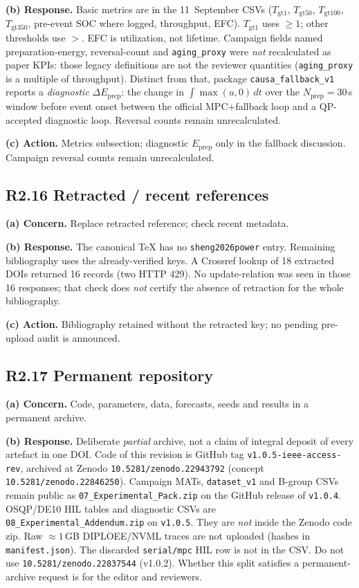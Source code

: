 \documentclass[11pt]{article}
\begin{document}
\textbf{(b) Response.} Basic metrics are in the 11~September CSVs ($T_{\mathrm{gt1}}$, $T_{\mathrm{gt50}}$, $T_{\mathrm{gt100}}$, $T_{\mathrm{gt350}}$, pre-event SOC where logged, throughput, EFC). $T_{\mathrm{gt1}}$ uses $\ge 1$; other thresholds use $>$. EFC is utilization, not lifetime. Campaign fields named preparation-energy, reversal-count and \texttt{aging\_proxy} were \emph{not} recalculated as paper KPIs: those legacy definitions are not the reviewer quantities (\texttt{aging\_proxy} is a multiple of throughput). Distinct from that, package \texttt{causa\_fallback\_v1} reports a \emph{diagnostic} $\Delta E_{\mathrm{prep}}$: the change in $\int\max(u,0)\,dt$ over the $N_{\mathrm{prep}}=30$\,s window before event onset between the official MPC+fallback loop and a QP-accepted diagnostic loop. Reversal counts remain unrecalculated.

\textbf{(c) Action.} Metrics subsection; diagnostic $E_{\mathrm{prep}}$ only in the fallback discussion. Campaign reversal counts remain unrecalculated.

\subsection*{R2.16 Retracted / recent references}
\textbf{(a) Concern.} Replace retracted reference; check recent metadata.

\textbf{(b) Response.} The canonical TeX has no \texttt{sheng2026power} entry. Remaining bibliography uses the already-verified keys. A Crossref lookup of 18 extracted DOIs returned 16 records (two HTTP 429). No update-relation was seen in those 16 responses; that check does \emph{not} certify the absence of retraction for the whole bibliography.

\textbf{(c) Action.} Bibliography retained without the retracted key; no pending pre-upload audit is announced.

\subsection*{R2.17 Permanent repository}
\textbf{(a) Concern.} Code, parameters, data, forecasts, seeds and results in a permanent archive.

\textbf{(b) Response.} Deliberate \emph{partial} archive, not a claim of integral deposit of every artefact in one DOI. Code of this revision is GitHub tag \texttt{v1.0.5-ieee-access-rev}, archived at Zenodo \texttt{10.5281/zenodo.22943792} (concept \texttt{10.5281/zenodo.22846250}). Campaign MATs, \texttt{dataset\_v1} and B-group CSVs remain public as \texttt{07\_Experimental\_Pack.zip} on the GitHub release of \texttt{v1.0.4}. OSQP/DE10 HIL tables and diagnostic CSVs are \texttt{08\_Experimental\_Addendum.zip} on \texttt{v1.0.5}. They are \emph{not} inside the Zenodo code zip. Raw $\approx 1$\,GB DIPLOEE/NVML traces are not uploaded (hashes in \texttt{manifest.json}). The discarded \texttt{serial/mpc} HIL row is not in the CSV. Do not use \texttt{10.5281/zenodo.22837544} (v1.0.2). Whether this split satisfies a permanent-archive request is for the editor and reviewers.
\end{document}
